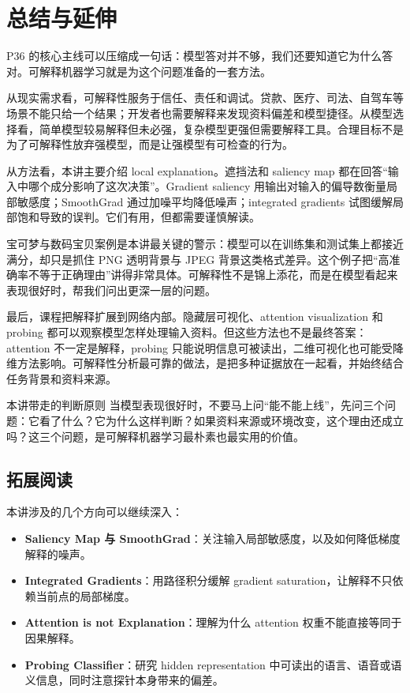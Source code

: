 \documentclass[a4paper]{article}
\begin{document}
\section{总结与延伸}

P36 的核心主线可以压缩成一句话：模型答对并不够，我们还要知道它为什么答对。可解释机器学习就是为这个问题准备的一套方法。

从现实需求看，可解释性服务于信任、责任和调试。贷款、医疗、司法、自驾车等场景不能只给一个结果；开发者也需要解释来发现资料偏差和模型捷径。从模型选择看，简单模型较易解释但未必强，复杂模型更强但需要解释工具。合理目标不是为了可解释性放弃强模型，而是让强模型有可检查的行为。

从方法看，本讲主要介绍 local explanation。遮挡法和 saliency map 都在回答“输入中哪个成分影响了这次决策”。Gradient saliency 用输出对输入的偏导数衡量局部敏感度；SmoothGrad 通过加噪平均降低噪声；integrated gradients 试图缓解局部饱和导致的误判。它们有用，但都需要谨慎解读。

宝可梦与数码宝贝案例是本讲最关键的警示：模型可以在训练集和测试集上都接近满分，却只是抓住 PNG 透明背景与 JPEG 背景这类格式差异。这个例子把“高准确率不等于正确理由”讲得非常具体。可解释性不是锦上添花，而是在模型看起来表现很好时，帮我们问出更深一层的问题。

最后，课程把解释扩展到网络内部。隐藏层可视化、attention visualization 和 probing 都可以观察模型怎样处理输入资料。但这些方法也不是最终答案：attention 不一定是解释，probing 只能说明信息可被读出，二维可视化也可能受降维方法影响。可解释性分析最可靠的做法，是把多种证据放在一起看，并始终结合任务背景和资料来源。

\begin{importantbox}{本讲带走的判断原则}
    当模型表现很好时，不要马上问“能不能上线”，先问三个问题：它看了什么？它为什么这样判断？如果资料来源或环境改变，这个理由还成立吗？这三个问题，是可解释机器学习最朴素也最实用的价值。
\end{importantbox}

\subsection{拓展阅读}

本讲涉及的几个方向可以继续深入：
\begin{itemize}
    \item \textbf{Saliency Map 与 SmoothGrad}：关注输入局部敏感度，以及如何降低梯度解释的噪声。
    \item \textbf{Integrated Gradients}：用路径积分缓解 gradient saturation，让解释不只依赖当前点的局部梯度。
    \item \textbf{Attention is not Explanation}：理解为什么 attention 权重不能直接等同于因果解释。
    \item \textbf{Probing Classifier}：研究 hidden representation 中可读出的语言、语音或语义信息，同时注意探针本身带来的偏差。
\end{itemize}
\end{document}
